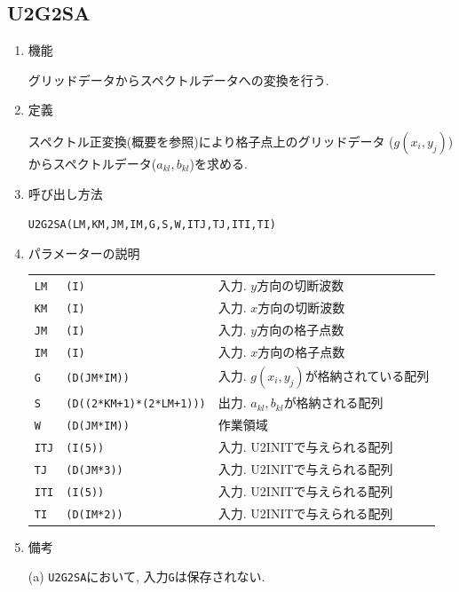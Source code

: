 \documentclass[a4j,fleqn]{jarticle}
\begin{document}

\subsection{U2G2SA}

\begin{enumerate}

\item 機能 

グリッドデータからスペクトルデータへの変換を行う.

\item 定義

スペクトル正変換(概要を参照)により格子点上のグリッドデータ
($g(x_i,y_j)$)からスペクトルデータ($a_{kl},b_{kl}$)を求める.

\item 呼び出し方法 

{\tt U2G2SA(LM,KM,JM,IM,G,S,W,ITJ,TJ,ITI,TI)}
  
\item パラメーターの説明

\begin{tabular}{lll}
{\tt LM} & {\tt (I)} & 入力. $y$方向の切断波数\\
{\tt KM} & {\tt (I)} & 入力. $x$方向の切断波数\\
{\tt JM} & {\tt (I)} & 入力. $y$方向の格子点数\\
{\tt IM} & {\tt (I)} & 入力. $x$方向の格子点数\\
{\tt G} & {\tt (D(JM*IM))} & 入力. $g(x_i,y_j)$が格納されている配列\\
{\tt S} & {\tt (D((2*KM+1)*(2*LM+1)))} & 出力. $a_{kl},b_{kl}$が格納される配列\\
{\tt W} & {\tt (D(JM*IM))} & 作業領域\\
{\tt ITJ} & {\tt (I(5))} & 入力. U2INITで与えられる配列\\
{\tt TJ} & {\tt (D(JM*3))} & 入力. U2INITで与えられる配列\\
{\tt ITI} & {\tt (I(5))} & 入力. U2INITで与えられる配列\\
{\tt TI} & {\tt (D(IM*2))} & 入力. U2INITで与えられる配列
\end{tabular}

\item 備考

(a) {\tt U2G2SA}において, 入力{\tt G}は保存されない.

\end{enumerate}
\end{document}
